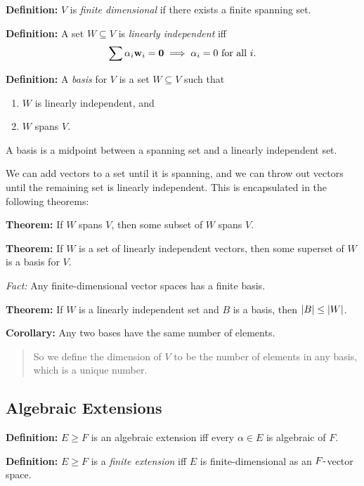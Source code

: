 \textbf{Definition:} \(V\) is \emph{finite dimensional} if there exists
a finite spanning set.

\textbf{Definition:} A set \(W \subseteq V\) is \emph{linearly
independent} iff \[
\sum \alpha_i \mathbf{w}_i = \mathbf{0} \implies \alpha_i = 0 \text{ for all } i
.\]

\textbf{Definition:} A \emph{basis} for \(V\) is a set \(W \subseteq V\)
such that

\begin{enumerate}
\def\labelenumi{\arabic{enumi}.}
\item
  \(W\) is linearly independent, and
\item
  \(W\) spans \(V\).
\end{enumerate}

A basis is a midpoint between a spanning set and a linearly independent
set.

We can add vectors to a set until it is spanning, and we can throw out
vectors until the remaining set is linearly independent. This is
encapsulated in the following theorems:

\textbf{Theorem:} If \(W\) spans \(V\), then some subset of \(W\) spans
\(V\).

\textbf{Theorem:} If \(W\) is a set of linearly independent vectors,
then some superset of \(W\) is a basis for \(V\).

\emph{Fact:} Any finite-dimensional vector spaces has a finite basis.

\textbf{Theorem:} If \(W\) is a linearly independent set and \(B\) is a
basis, then \({\left\lvert {B} \right\rvert} \leq {\left\lvert {W} \right\rvert}\).

\textbf{Corollary:} Any two bases have the same number of elements.

\begin{quote}
So we define the dimension of \(V\) to be the number of elements in any
basis, which is a unique number.
\end{quote}

\hypertarget{algebraic-extensions}{%
\subsection{Algebraic Extensions}\label{algebraic-extensions}}

\textbf{Definition:} \(E \geq F\) is an algebraic extension iff every
\(\alpha \in E\) is algebraic of \(F\).

\textbf{Definition:} \(E \geq F\) is a \emph{finite extension} iff \(E\)
is finite-dimensional as an \(F{\hbox{-}}\)vector space.

